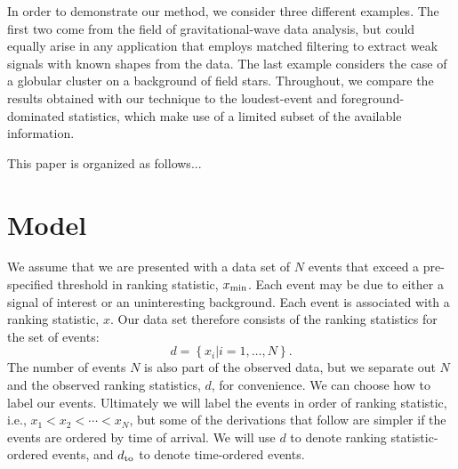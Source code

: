 \documentclass[aps,prd]{revtex4-1}
\newcommand{\fixme}[1]{\textbf{FIXME: #1}}
\newcommand{\mathset}[1]{\left\{ #1 \right\}}
\begin{document}
In order to demonstrate our method, we consider three different examples.  The first two come from the field of gravitational-wave data analysis, but could equally arise in any application that employs matched filtering \cite{FINDCHIRP} to extract weak signals with known shapes from the data.  The last example considers the case of a globular cluster on a background of field stars.  Throughout, we compare the results obtained with our technique to the loudest-event and foreground-dominated statistics, which make use of a limited subset of the available information.

 This paper is organized as follows...







  
  
  





\section{Model}\label{sec:model}

We assume that we are presented with a data set of $N$ events that exceed a pre-specified threshold in ranking statistic, $x_{\rm min}$.  Each
event may be due to either a signal of interest or an uninteresting
background.  Each event is associated with a ranking statistic, $x$.
Our data set therefore consists of the ranking statistics for the set
of events:
\begin{equation}
  d = \mathset{ x_i | i = 1, \ldots, N } .
\end{equation}
The number of events $N$ is also part of the observed data, but we
separate out $N$ and the observed ranking statistics, $d$, for
convenience. We can choose how to label our events. Ultimately we will
label the events in order of ranking statistic, i.e., $x_1 < x_2 <
\cdots < x_N$, but some of the derivations that follow are simpler if
the events are ordered by time of arrival. We will use $d$ to denote
ranking statistic-ordered events, and $d_{\rm to}$ to denote
time-ordered events.
\end{document}
